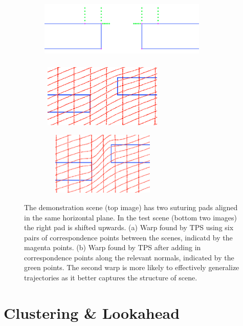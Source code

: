 \documentclass{article}
\begin{document}
\begin{figure}[h!]
\centering
\begin{subfigure}[b]{0.9\textwidth}
\centering
\hspace{-0.7cm}
\includegraphics[width=8cm, height=3cm]{normals_points}
\end{subfigure}
\begin{subfigure}[b]{0.4\textwidth}
\includegraphics[width=6cm, height=3cm]{TPS_withoutnormals}
\caption{}
\end{subfigure}
\hspace{0.02\textwidth}
\begin{subfigure}[b]{0.4\textwidth}
\includegraphics[width=6cm, height=3cm]{TPS_withnormals}
\caption{}
\end{subfigure}
\caption{The demonstration scene (top image) has two suturing pads aligned in the same horizontal plane. In the test scene (bottom two images) the right pad is shifted upwards. (a) Warp found by TPS using six pairs of correspondence points between the scenes, indicatd by the magenta points. (b) Warp found by TPS after adding in correspondence points along the relevant normals, indicated by the green points. The second warp is more likely to effectively generalize trajectories as it better captures the structure of scene.}
\label{fig:normals}
\end{figure}



\section{Clustering \& Lookahead}
\end{document}
